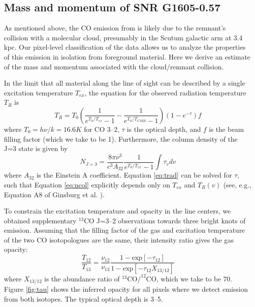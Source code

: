 \subsection{Mass and momentum of SNR G1605-0.57}
As mentioned above, the CO emission from \snr{} is likely due to the remnant's collision with a molecular cloud, presumably in the Scutum galactic arm at 3.4 kpc. Our pixel-level classification of the data allows us to analyze the properties of this emission in isolation from foreground material. Here we derive an estimate of the mass and momentum associated with the cloud/remnant collision.

In the limit that all material along the line of sight can be described by a single excitation temperature $T_{ex}$, the equation for the observed radiation temperature $T_R$ is \citep{Ginsburg11}
\begin{equation}
T_R = T_0\left(\frac1{e^{T_0/T_{ex}}-1} - \frac1{e^{T_0/T_{CMB}} - 1} \right) \left(1-e^{-\tau} \right) f
\label{eq:trad}
\end{equation}
\noindent where $T_0 = h \nu / k = 16.6K$ for CO 3--2, $\tau$ is the optical depth, and $f$ is the beam filling factor (which we take to be 1). Furthermore,
the column density of the J=3 state is given by
\begin{equation}
N_{J=3} = \frac{8 \pi \nu^3}{c^3 A_{32}} \frac1{e^{T_0/T_{ex}} - 1} \int \tau_v dv
\label{eq:ncol}
\end{equation}
\noindent where $A_{32}$ is the Einstein A coefficient. Equation \ref{eq:trad} can be solved for $\tau$, such that Equation \ref{eq:ncol} explicitly depends only on $T_{ex}$ and $T_R(v)$ (see, e.g., Equation A8 of Ginsburg et al. \citeyear{Ginsburg11}).

To constrain the excitation temperature and opacity in the line centers, we obtained supplementary $^{13}$CO J=3--2 observations towards three bright knots of emission. Assuming that the filling factor of the gas and excitation temperature of the two CO isotopologues are the same, their intensity ratio gives the gas opacity:
\begin{equation}
\frac{T_{12}}{T_{13}} = \frac{\nu_{12}}{\nu_{13}} \frac{ 1 - \text{exp}[-\tau_{12}]}{1 - \text{exp}[-\tau_{12} X_{13/12}]}
\label{eq:tau}
\end{equation}
\noindent where $X_{13/12}$ is the abundance ratio of $^{13}\text{CO}/ ^{12}\text{CO}$, which we take to be 70. Figure \ref{fig:tau} shows the inferred opacity for all pixels where we detect emission from both isotopes. The typical optical depth is 3--5.

